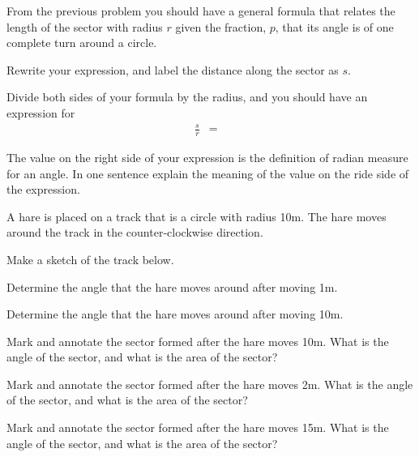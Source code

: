 \begin{problem}
\begin{subproblem}
  \end{subproblem}

\clearpage

\item From the previous problem you should have a general formula that
  relates the length of the sector with radius $r$ given the
  fraction, $p$, that its angle is of one complete turn around a
  circle.

  \begin{subproblem}
  \item Rewrite your expression, and label the distance along the
    sector as $s$.
    \vfill
  \item Divide both sides of your formula by the radius, and you
    should have an expression for
    \begin{eqnarray*}
    \frac{s}{r} & = &
    \end{eqnarray*}

  \item The value on the right side of your expression is the
    definition of radian measure for an angle. In one sentence explain
    the meaning of the value on the ride side of the expression.

    \vfill

  \end{subproblem}

  \clearpage

\item A hare is placed on a track that is a circle with radius
  10m. The hare moves around the track in the counter-clockwise
  direction.
  \begin{subproblem}
  \item Make a sketch of the track below.
    \vfill

  \item Determine the angle that the hare moves around after moving
    1m.  
    \vfill

  \item Determine the angle that the hare moves around after moving 10m.
    \vfill

  \item Mark and annotate the sector formed after the hare moves
    10m. What is the angle of the sector, and what is the area of the
    sector?
    \vfill

  \item Mark and annotate the sector formed after the hare moves
    2m. What is the angle of the sector, and what is the area of the
    sector?
    \vfill
  \item Mark and annotate the sector formed after the hare moves
    15m. What is the angle of the sector, and what is the area of the
    sector?
    \vfill
  \end{subproblem}


\end{problem}
